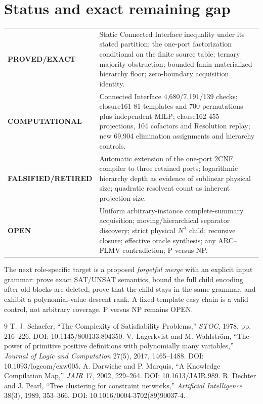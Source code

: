 \documentclass[11pt]{article}
\begin{document}
\section{Status and exact remaining gap}
\begin{center}
\small
\begin{tabular}{p{.25\linewidth}p{.67\linewidth}}
\toprule
\textbf{PROVED/EXACT} & Static Connected Interface inequality under its
stated partition; the one-port factorization conditional on the finite source
table; ternary majority obstruction; bounded-fanin materialized hierarchy
floor; zero-boundary acquisition identity.\\
\textbf{COMPUTATIONAL} & Connected Interface 4,680/7,191/139 checks;
closure161 81 templates and 700 permutations plus independent MILP;
clause162 455 projections, 104 cofactors and Resolution replay; new 69,904
elimination assignments and hierarchy controls.\\
\textbf{FALSIFIED/RETIRED} & Automatic extension of the one-port $2$CNF
compiler to three retained ports; logarithmic hierarchy depth as evidence of
sublinear physical size; quadratic resolvent count as inherent projection
size.\\
\textbf{OPEN} & Uniform arbitrary-instance complete-summary acquisition;
moving/hierarchical separator discovery; strict physical $N^\lambda$ child;
recursive closure; effective oracle synthesis; any ARC--FLMV contradiction;
P versus NP.\\
\bottomrule
\end{tabular}
\normalsize
\end{center}

The next role-specific target is a proposed \emph{forgetful merge} with an
explicit input grammar: prove exact SAT/UNSAT semantics, bound the full child
encoding after old blocks are deleted, prove that the child stays in the same
grammar, and exhibit a polynomial-value descent rank.  A fixed-template easy
chain is a valid control, not arbitrary coverage.  P versus NP remains OPEN.

\begin{thebibliography}{9}
 T. J. Schaefer, ``The Complexity of Satisfiability
Problems,'' \emph{STOC}, 1978, pp. 216--226. DOI: 10.1145/800133.804350.
 V. Lagerkvist and M. Wahlstr\"om, ``The power of
primitive positive definitions with polynomially many variables,''
\emph{Journal of Logic and Computation} 27(5), 2017, 1465--1488.
DOI: 10.1093/logcom/exw005.
 A. Darwiche and P. Marquis, ``A Knowledge Compilation
Map,'' \emph{JAIR} 17, 2002, 229--264. DOI: 10.1613/JAIR.989.
 R. Dechter and J. Pearl, ``Tree clustering for constraint
networks,'' \emph{Artificial Intelligence} 38(3), 1989, 353--366.
DOI: 10.1016/0004-3702(89)90037-4.
\end{thebibliography}

\end{document}
